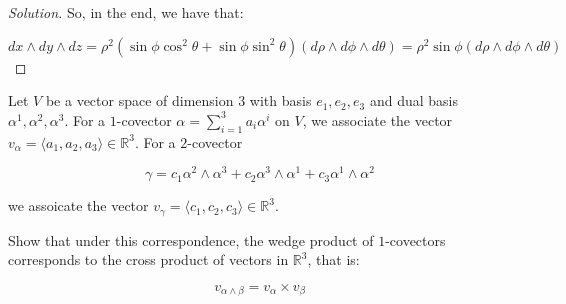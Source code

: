 \documentclass[10pt]{article}
\newenvironment{problem}[2][]{\begin{trivlist}
\item[\hskip \labelsep {\bfseries #1}\hskip \labelsep {\bfseries #2.}]}{\end{trivlist}}
\begin{document}
\begin{proof}[Solution]
So, in the end, we have that:

$$ dx \wedge dy \wedge dz = \rho^2 (\sin \phi \cos^2 \theta +  \sin \phi \sin^2 \theta) (d\rho \wedge d\phi \wedge d\theta) = \rho^2 \sin \phi  (d\rho \wedge d\phi \wedge d\theta) $$



\end{proof}

\begin{problem}{Question 3}

Let $V$ be a vector space of dimension 3 with basis $e_1, e_2, e_3$ and dual basis $\alpha^1, \alpha^2, \alpha^3$. For a $1$-covector $\alpha = \sum_{i=1}^3 a_i \alpha^i$ on $V$, we associate the vector $v_\alpha = \langle a_1, a_2, a_3 \rangle \in \mathbb{R}^3$. For a $2$-covector

$$ \gamma = c_1 \alpha^2 \wedge \alpha^3 + c_2 \alpha^3 \wedge \alpha^1 + c_3 \alpha^1 \wedge \alpha^2$$

we assoicate the vector $v_\gamma = \langle c_1, c_2, c_3 \rangle \in \mathbb{R}^3$.

Show that under this correspondence, the wedge product of $1$-covectors corresponds to the cross product of vectors in $\mathbb{R}^3$, that is:

$$ v_{\alpha \wedge \beta} = v_\alpha \times v_\beta $$

\end{problem}
\end{document}
